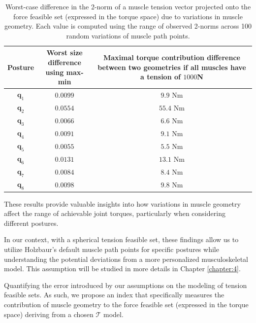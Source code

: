 \begin{table}[!ht]
    \centering
    \begin{tabular}{|c||c|c|}
    \hline
    Posture & \makecell{Worst size difference \\ using max-min} & \makecell{Maximal torque contribution difference \\ between two geometries if \\ all muscles have a tension of $1000$N} \\
    \hline
    \hline
    $\mathbf{q}_1$ & $0.0099$ & $9.9$ Nm \\ \hline
    $\mathbf{q}_2$ & $0.0554$ & $55.4$ Nm \\ \hline
    $\mathbf{q}_3$ & $0.0066$ & $6.6$ Nm \\ \hline
    $\mathbf{q}_4$ & $0.0091$ & $9.1$ Nm \\ \hline
    $\mathbf{q}_5$ & $0.0055$ & $5.5$ Nm \\ \hline
    $\mathbf{q}_6$ & $0.0131$ & $13.1$ Nm \\ \hline
    $\mathbf{q}_7$ & $0.0084$ & $8.4$ Nm \\ \hline
    $\mathbf{q}_8$ & $0.0098$ & $9.8$ Nm \\ \hline
    \end{tabular}
    \caption{Worst-case difference in the 2-norm of a muscle tension vector projected onto the force feasible set (expressed in the torque space) due to variations in muscle geometry. Each value is computed using the range of observed 2-norms across 100 random variations of muscle path points.}
    \label{tab:sensitivity2}
\end{table}

These results provide valuable insights into how variations in muscle geometry affect the range of achievable joint torques, particularly when considering different postures.

In our context, with a spherical tension feasible set, these findings allow us to utilize Holzbaur's default muscle path points for specific postures while understanding the potential deviations from a more personalized musculoskeletal model. This assumption will be studied in more details in Chapter \ref{chapter:4}.

Quantifying the error introduced by our assumptions on the modeling of tension feasible sets. As such, we propose an index that specifically measures the contribution of muscle geometry to the force feasible set (expressed in the torque space) deriving from a chosen $\mathcal{T}$ model.

